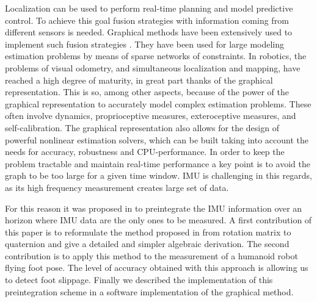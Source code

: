 Localization can be used to perform real-time planning and model predictive control.
To achieve this goal fusion strategies with information coming from different sensors is needed.
Graphical methods have been extensively used to implement such fusion strategies \cite{Thrun:ijrr:2006,Kaess:itro:2008}.
They have been used for large modeling estimation problems by means of sparse networks of constraints. 
In robotics, the problems of visual odometry, and simultaneous localization and mapping, have reached a high degree of maturity, 
in great part thanks of the graphical representation. 
This is so, among other aspects, because of the power of the graphical representation to accurately model complex estimation problems. 
These often involve dynamics, proprioceptive measures, exteroceptive measures, and self-calibration.
The graphical representation also allows for the design of powerful nonlinear estimation solvers, which can be built taking into account the needs for accuracy, 
robustness and CPU-performance.
In order to keep the problem tractable and maintain real-time performance a key point is to avoid the graph to be too large for a given time window.
IMU is challenging in this regards, as its high frequency measurement creates large set of data. 
 
For this reason it was proposed in \cite{LUPTON-09,forster2015imu} to preintegrate the IMU information over an horizon where IMU data are the only
ones to be measured.
A first contribution of this paper is to reformulate the method proposed in \cite{forster2015imu} from rotation matrix to quaternion
and give a detailed and simpler algebraic derivation.
The second contribution is to apply this method to the measurement of a humanoid robot flying foot pose.
The level of accuracy obtained with this approach is allowing us to detect foot slippage. 
Finally we described the implementation of this preintegration scheme in a software implementation of the graphical method.




